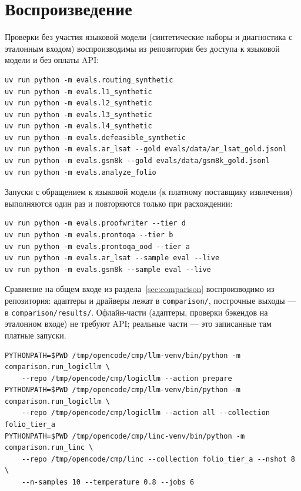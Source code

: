 \documentclass[11pt,a4paper]{article}
\begin{document}
\section{Воспроизведение}
\label{app:repro}

Проверки без участия языковой модели (синтетические наборы и диагностика с эталонным входом) воспроизводимы из репозитория без доступа к языковой модели и без оплаты API:

\begin{verbatim}
uv run python -m evals.routing_synthetic
uv run python -m evals.l1_synthetic
uv run python -m evals.l2_synthetic
uv run python -m evals.l3_synthetic
uv run python -m evals.l4_synthetic
uv run python -m evals.defeasible_synthetic
uv run python -m evals.ar_lsat --gold evals/data/ar_lsat_gold.jsonl
uv run python -m evals.gsm8k --gold evals/data/gsm8k_gold.jsonl
uv run python -m evals.analyze_folio
\end{verbatim}

Запуски с обращением к языковой модели (к платному поставщику извлечения) выполняются один раз и повторяются только при расхождении:

\begin{verbatim}
uv run python -m evals.proofwriter --tier d
uv run python -m evals.prontoqa --tier b
uv run python -m evals.prontoqa_ood --tier a
uv run python -m evals.ar_lsat --sample eval --live
uv run python -m evals.gsm8k --sample eval --live
\end{verbatim}

Сравнение на общем входе из раздела~\ref{sec:comparison} воспроизводимо из репозитория: адаптеры и драйверы
лежат в \texttt{comparison/}, построчные выходы — в \texttt{comparison/results/}. Офлайн-части (адаптеры,
проверки бэкендов на эталонном входе) не требуют API; реальные части — это записанные там платные запуски.

\begin{verbatim}
PYTHONPATH=$PWD /tmp/opencode/cmp/llm-venv/bin/python -m comparison.run_logicllm \
    --repo /tmp/opencode/cmp/logicllm --action prepare
PYTHONPATH=$PWD /tmp/opencode/cmp/llm-venv/bin/python -m comparison.run_logicllm \
    --repo /tmp/opencode/cmp/logicllm --action all --collection folio_tier_a
PYTHONPATH=$PWD /tmp/opencode/cmp/linc-venv/bin/python -m comparison.run_linc \
    --repo /tmp/opencode/cmp/linc --collection folio_tier_a --nshot 8 \
    --n-samples 10 --temperature 0.8 --jobs 6
\end{verbatim}
\end{document}
